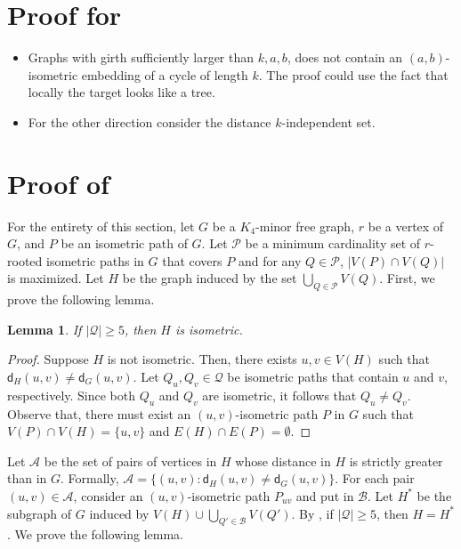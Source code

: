 \documentclass[a4paper]{article}
\newcommand{\distG}[3]{\mathsf{d}_{#1}\left(#2,#3\right)}
\newtheorem{lemma}{Lemma}
\begin{document}
\section{Proof for }


\begin{itemize}
	\item Graphs with girth sufficiently larger than $k,a,b$, does not contain an $(a,b)$-isometric embedding of a cycle of length $k$. 
	The proof could use the fact that locally the target looks like a tree.
	  
	
	\item For the other direction consider the distance $k$-independent set. 
\end{itemize}

\section{Proof of }


For the entirety of this section, let $G$ be a $K_4$-minor free graph, $r$ be a vertex of $G$, and $P$ be an isometric path of $G$. Let $\mathcal{P}$ be a minimum cardinality set of $r$-rooted isometric paths in $G$ that covers $P$ and for any $Q\in \mathcal{P}$, $|V(P)\cap V(Q)|$ is maximized. Let $H$ be the graph induced by the set $\displaystyle\bigcup\limits_{Q\in \mathcal{P}} V(Q)$. First, we prove the following lemma.

\begin{lemma}\label{lem:1st-isometric}
	If $|\mathcal{Q}| \geq 5$, then $H$ is isometric.
\end{lemma}
\begin{proof}
	Suppose $H$ is not isometric. Then, there exists $u,v\in V(H)$ such that $\distG{H}{u}{v} \neq \distG{G}{u}{v}$. Let $Q_u,Q_v \in \mathcal{Q}$ be isometric paths that contain $u$ and $v$, respectively. Since both $Q_u$ and $Q_v$ are isometric, it follows that $Q_u\neq Q_v$. Observe that, there must exist an $(u,v)$-isometric path $P$ in $G$ such that $V(P)\cap V(H)=\{u,v\}$ and $E(H)\cap E(P)=\emptyset$. 
\end{proof}

Let $\mathcal{A}$ be the set of pairs of vertices in $H$ whose distance in $H$ is strictly greater than in $G$. Formally, $\mathcal{A}=\{(u,v) \colon \distG{H}{u}{v} \neq \distG{G}{u}{v}  \}$.  For each pair $(u,v)\in \mathcal{A}$, consider an $(u,v)$-isometric path $P_{uv}$ and put in $\mathcal{B}$. Let $H^*$ be the subgraph of $G$ induced by $V(H)\cup \displaystyle\bigcup\limits_{Q'\in \mathcal{B}} V(Q')$.  By , if $|\mathcal{Q}|\geq 5$, then $H=H^*$. We prove the following lemma.
\end{document}

